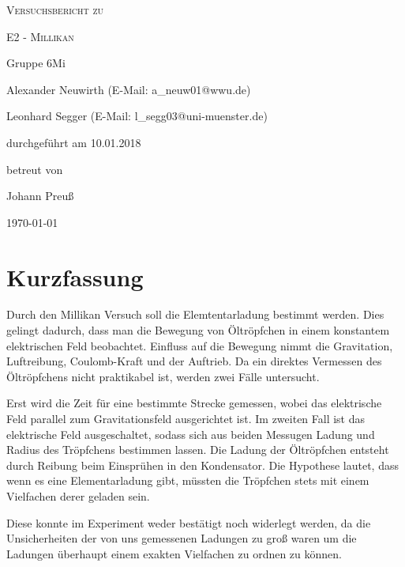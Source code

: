 \documentclass[
	a4paper,
	12pt,
	pagesize,
	ngerman
]{scrartcl}
\begin{document}
	
	\begin{titlepage}
		\centering
		{\scshape\LARGE Versuchsbericht zu \par}
		\vspace{1cm}
		{\scshape\huge E2 - Millikan \par}
		\vspace{2.5cm}
		{\LARGE Gruppe 6Mi \par}
		\vspace{0.5cm}
		
		{\large Alexander Neuwirth (E-Mail: a\_neuw01@wwu.de) \par}
		{\large Leonhard Segger (E-Mail: l\_segg03@uni-muenster.de) \par}
		\vfill
		
		durchgeführt am 10.01.2018\par
		betreut von\par
		{\large Johann Preuß}
		
		\vfill
		
		{\large \today\par}
	\end{titlepage}
	\tableofcontents
	\newpage
	
	\section{Kurzfassung}
	Durch den Millikan Versuch soll die Elemtentarladung bestimmt werden.
	Dies gelingt dadurch, dass man die Bewegung von Öltröpfchen in einem konstantem elektrischen Feld beobachtet.
	Einfluss auf die Bewegung nimmt die Gravitation, Luftreibung, Coulomb-Kraft und der Auftrieb.
	Da ein direktes Vermessen des Öltröpfchens nicht praktikabel ist, werden zwei Fälle untersucht.

	Erst wird die Zeit für eine bestimmte Strecke gemessen, wobei das elektrische Feld parallel zum Gravitationsfeld ausgerichtet ist. 
	Im zweiten Fall ist das elektrische Feld ausgeschaltet, sodass sich aus beiden Messugen Ladung und Radius des Tröpfchens bestimmen lassen.
	Die Ladung der Öltröpfchen entsteht durch Reibung beim Einsprühen in den Kondensator. 
	Die Hypothese lautet, dass wenn es eine Elementarladung gibt, müssten die Tröpfchen stets mit einem Vielfachen derer geladen sein. 

	Diese konnte im Experiment weder bestätigt noch widerlegt werden, da die Unsicherheiten der von uns gemessenen Ladungen zu groß waren um die Ladungen überhaupt einem exakten Vielfachen zu ordnen zu können.
\end{document}
